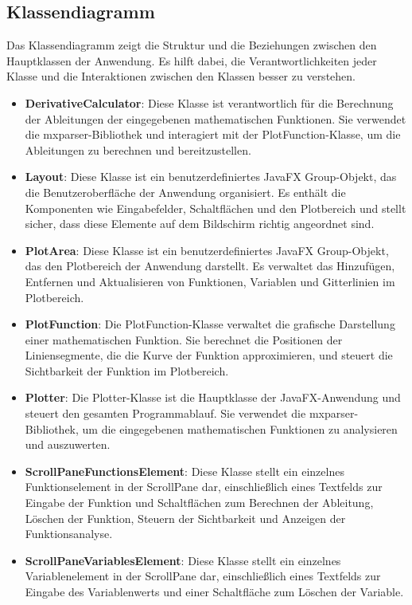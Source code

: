 \documentclass[a4paper]{article}
\begin{document}
\subsection{Klassendiagramm}

Das Klassendiagramm zeigt die Struktur und die Beziehungen zwischen den Hauptklassen der Anwendung. Es hilft dabei, die Verantwortlichkeiten jeder Klasse und die Interaktionen zwischen den Klassen besser zu verstehen.

\begin{itemize}
	\item \textbf{DerivativeCalculator}: Diese Klasse ist verantwortlich für die Berechnung der Ableitungen der eingegebenen mathematischen Funktionen. Sie verwendet die mxparser-Bibliothek und interagiert mit der PlotFunction-Klasse, um die Ableitungen zu berechnen und bereitzustellen.
	\item \textbf{Layout}: Diese Klasse ist ein benutzerdefiniertes JavaFX Group-Objekt, das die Benutzeroberfläche der Anwendung organisiert. Es enthält die Komponenten wie Eingabefelder, Schaltflächen und den Plotbereich und stellt sicher, dass diese Elemente auf dem Bildschirm richtig angeordnet sind.

	\item \textbf{PlotArea}: Diese Klasse ist ein benutzerdefiniertes JavaFX Group-Objekt, das den Plotbereich der Anwendung darstellt. Es verwaltet das Hinzufügen, Entfernen und Aktualisieren von Funktionen, Variablen und Gitterlinien im Plotbereich.

	\item \textbf{PlotFunction}: Die PlotFunction-Klasse verwaltet die grafische Darstellung einer mathematischen Funktion. Sie berechnet die Positionen der Liniensegmente, die die Kurve der Funktion approximieren, und steuert die Sichtbarkeit der Funktion im Plotbereich.

	\item \textbf{Plotter}: Die Plotter-Klasse ist die Hauptklasse der JavaFX-Anwendung und steuert den gesamten Programmablauf. Sie verwendet die mxparser-Bibliothek, um die eingegebenen mathematischen Funktionen zu analysieren und auszuwerten.

	\item \textbf{ScrollPaneFunctionsElement}: Diese Klasse stellt ein einzelnes Funktionselement in der ScrollPane dar, einschließlich eines Textfelds zur Eingabe der Funktion und Schaltflächen zum Berechnen der Ableitung, Löschen der Funktion, Steuern der Sichtbarkeit und Anzeigen der Funktionsanalyse.

	\item \textbf{ScrollPaneVariablesElement}: Diese Klasse stellt ein einzelnes Variablenelement in der ScrollPane dar, einschließlich eines Textfelds zur Eingabe des Variablenwerts und einer Schaltfläche zum Löschen der Variable.
\end{itemize}
\end{document}
